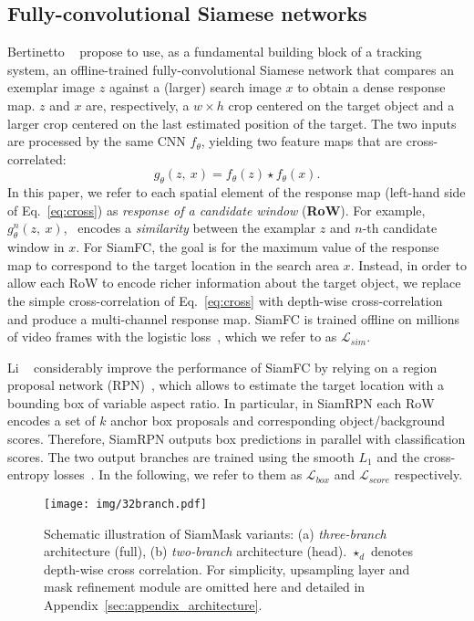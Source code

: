 \documentclass[10pt,twocolumn,letterpaper]{article}
\newcommand{\mypar}[1]{\smallskip\noindent {\bf #1}\enskip}
\begin{document}
\subsection{Fully-convolutional Siamese networks}
\label{sec:fc}
\mypar{SiamFC.}
Bertinetto \etal~\cite{bertinetto2016fully} propose to use, as a fundamental building block of a tracking system, an offline-trained fully-convolutional Siamese network that compares an exemplar image $z$ against a (larger) search image $x$ to obtain a dense response map.
$z$ and $x$ are, respectively, a $w{\times}h$ crop centered on the target object  and a larger crop centered on the last estimated position of the target.
The two inputs are processed by the same CNN $f_{\theta}$, yielding two feature maps that are cross-correlated:
\begin{equation}\label{eq:cross}
g_{\theta}(z,~x) = f_{\theta}(z) \star f_{\theta}(x).
\end{equation}
In this paper, we refer to each spatial element of the response map (left-hand side of Eq.~\ref{eq:cross}) as \emph{response of a candidate window} (\textbf{RoW}).
For example, ~$g_{\theta}^{n}(z,~x)$, ~encodes a \textit{similarity} between the examplar $z$ and $n$-th candidate window in $x$.
For SiamFC, the goal is for the maximum value of the response map to correspond to the target location in the search area $x$.
Instead, in order to allow each RoW to encode richer information about the target object, we replace the simple cross-correlation of Eq.~\ref{eq:cross} with depth-wise cross-correlation~\cite{bertinetto2016learning} and produce a multi-channel response map.
SiamFC is trained offline on millions of video frames with the logistic loss~\cite[Section 2.2]{bertinetto2016fully}, which we refer to as $\mathcal{L}_{sim}$.

\mypar{SiamRPN.}
Li \etal~\cite{SiamRPN} considerably improve the performance of SiamFC by relying on a region proposal network (RPN)~\cite{ren2015faster, feichtenhofer2017detect}, which allows to estimate the target location with a bounding box of variable aspect ratio.
In particular, in SiamRPN each RoW encodes a set of $k$ anchor box proposals and corresponding object/background scores.
Therefore, SiamRPN outputs box predictions in parallel with classification scores.
The two output branches are trained using the smooth $L_{1}$ and the cross-entropy losses~\cite[Section 3.2]{SiamRPN}.
In the following, we refer to them as $\mathcal{L}_{box}$ and $\mathcal{L}_{score}$ respectively.

\begin{figure*}
\begin{center}
\texttt{[image: img/32branch.pdf]}
\end{center}
\caption{Schematic illustration of SiamMask variants: (a) \textit{three-branch} architecture (full), (b) \textit{two-branch} architecture (head).  $\star_d$ denotes depth-wise cross correlation. For simplicity, upsampling layer and mask refinement module are omitted here and detailed in Appendix~\ref{sec:appendix_architecture}.}
\label{fig:schematic}
\vspace{-0.2cm}
\end{figure*}
\end{document}
